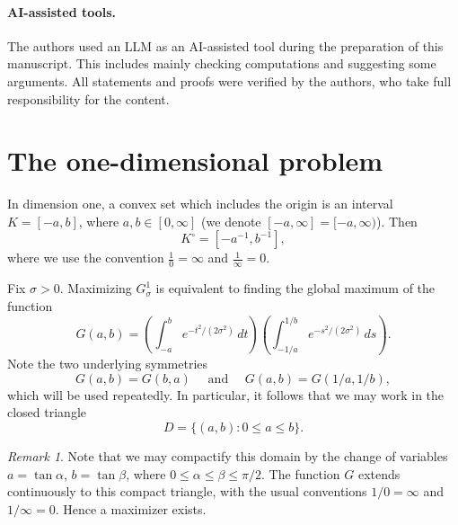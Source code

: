\documentclass[12pt,oneside,reqno]{amsart}
\numberwithin{equation}{section}
\theoremstyle{remark}
\newtheorem{remark}[theorem]{Remark}
\newcommand{\dd}{\,d}
\begin{document}
\paragraph{AI-assisted tools.}
The authors used an LLM as an AI-assisted tool during the preparation of this manuscript. This includes mainly checking computations and suggesting some arguments. All statements and proofs were verified by the authors, who take full responsibility for the content.

\section{The one-dimensional problem}\label{sec:one-dim}


In dimension one, a convex set which includes the origin is an interval $K=[-a,b]$, where $a,b\in[0,\infty]$ (we denote $[-a,\infty] = [-a, \infty)$). Then 
\[
        K^\circ=[-a^{-1},b^{-1}],
\]
where we use the convention $\frac{1}{0}=\infty$ and $\frac{1}{\infty}=0$.

Fix $\sigma>0$. Maximizing $G_\sigma^1$ is equivalent to finding the global maximum of the function 
\begin{equation}\label{eq:Gab}
        G(a,b)=
        \left(\int_{-a}^{b} e^{-t^2/(2\sigma^2)}\dd t\right)
        \left(\int_{-1/a}^{1/b} e^{-s^2/(2\sigma^2)}\dd s\right).
\end{equation}
Note the two underlying symmetries 
\begin{equation}\label{eq:G-symmetries}
        G(a,b)=G(b,a)\quad \text{ and } \quad G(a,b)=G(1/a,1/b),
\end{equation}
which will be used repeatedly. In particular, it follows that we may work in the closed triangle
\[
        D=\{(a,b):0\le a\le b\}.
\]
\begin{remark}\label{rem:compactification}
Note that we may compactify this domain by the change of variables \(a=\tan\alpha\), \(b=\tan\beta\), where \(0\le\alpha\le\beta\le\pi/2\). The function \(G\) extends continuously to this compact triangle, with the usual conventions \(1/0=\infty\) and \(1/\infty=0\). Hence a maximizer exists.
\end{remark}
\end{document}
